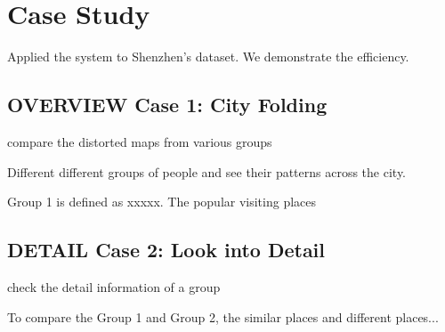 \section{Case Study}

Applied the system to Shenzhen's dataset. We demonstrate the efficiency. 

\subsection{OVERVIEW Case 1: City Folding}

compare the distorted maps from various groups

Different different groups of people and see their patterns across the city.

Group 1 is defined as xxxxx. The popular visiting places

\subsection{DETAIL Case 2: Look into Detail}

check the detail information of a group

To compare the Group 1 and Group 2, the similar places and different places...